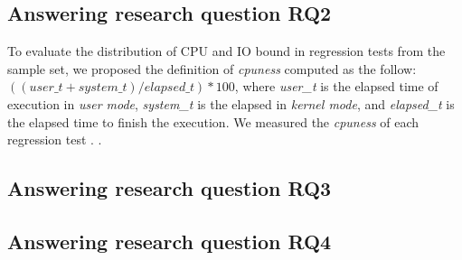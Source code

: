 \subsection{Answering research question RQ2}
\label{sec:rqtwo}


To evaluate the distribution of CPU and IO bound in regression tests
from the sample set, we proposed the definition of \emph{cpuness}
computed as the follow: $((user\_t + system\_t) / elapsed\_t) * 100$,
where \emph{user\_t} is the elapsed time of execution in \emph{user
mode}, \emph{system\_t} is the elapsed in \emph{kernel mode}, and
\emph{elapsed\_t} is the elapsed time to finish the execution. We
measured the \emph{cpuness} of each regression test  .  .  

\subsection{Answering research question RQ3}
\label{sec:rqthree}



\subsection{Answering research question RQ4}
\label{sec:rqfour}




